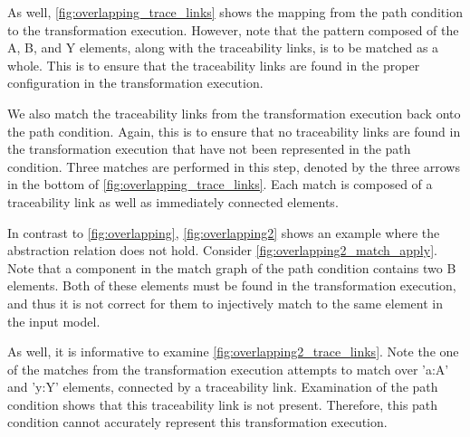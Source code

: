 As well, \cref{fig:overlapping_trace_links} shows the mapping from the path condition to the transformation execution. However, note that the pattern composed of the A, B, and Y elements, along with the traceability links, is to be matched as a whole. This is to ensure that the traceability links are found in the proper configuration in the transformation execution.

We also match the traceability links from the transformation execution back onto the path condition. Again, this is to ensure that no traceability links are found in the transformation execution that have not been represented in the path condition. Three matches are performed in this step, denoted by the three arrows in the bottom of \cref{fig:overlapping_trace_links}. Each match is composed of a traceability link as well as immediately connected elements.



In contrast to \cref{fig:overlapping}, \cref{fig:overlapping2} shows an example where the abstraction relation does not hold. Consider \cref{fig:overlapping2_match_apply}. Note that a component in the match graph of the path condition contains two B elements. Both of these elements must be found in the transformation execution, and thus it is not correct for them to injectively match to the same element in the input model.

As well, it is informative to examine \cref{fig:overlapping2_trace_links}. Note the one of the matches from the transformation execution attempts to match over 'a:A' and 'y:Y' elements, connected by a traceability link. Examination of the path condition shows that this traceability link is not present. Therefore, this path condition cannot accurately represent this transformation execution.


